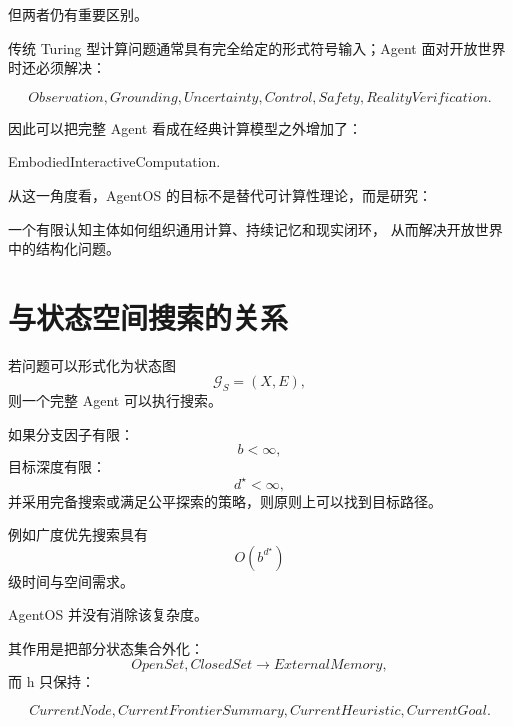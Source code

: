 但两者仍有重要区别。

传统 Turing 型计算问题通常具有完全给定的形式符号输入；Agent 面对开放世界时还必须解决：

\begin{equation}
Observation,
Grounding,
Uncertainty,
Control,
Safety,
RealityVerification.
\end{equation}

因此可以把完整 Agent 看成在经典计算模型之外增加了：

\begin{statementbox}
EmbodiedInteractiveComputation.
\end{statementbox}

从这一角度看，AgentOS 的目标不是替代可计算性理论，而是研究：

\begin{statementbox}
一个有限认知主体如何组织通用计算、持续记忆和现实闭环，
从而解决开放世界中的结构化问题。
\end{statementbox}

\section{与状态空间搜索的关系}

若问题可以形式化为状态图
\begin{equation}
\mathcal G_S=(X,E),
\end{equation}
则一个完整 Agent 可以执行搜索。

如果分支因子有限：
\begin{equation}
b<\infty,
\end{equation}
目标深度有限：
\begin{equation}
d^\star<\infty,
\end{equation}
并采用完备搜索或满足公平探索的策略，则原则上可以找到目标路径。

例如广度优先搜索具有
\begin{equation}
O(b^{d^\star})
\end{equation}
级时间与空间需求。

AgentOS 并没有消除该复杂度。

其作用是把部分状态集合外化：
\begin{equation}
OpenSet,
ClosedSet
\rightarrow
ExternalMemory,
\end{equation}
而 h 只保持：

\begin{equation}
CurrentNode,
CurrentFrontierSummary,
CurrentHeuristic,
CurrentGoal.
\end{equation}


